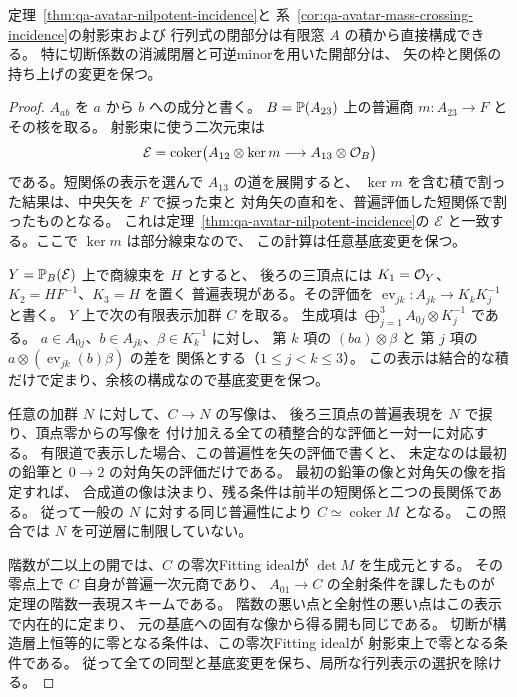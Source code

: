 \begin{proposition}[有限窓の積による行列式構成の内在的表示]
\label{prop:qa-avatar-intrinsic-incidence}
定理~\ref{thm:qa-avatar-nilpotent-incidence}と
系~\ref{cor:qa-avatar-mass-crossing-incidence}の射影束および
行列式の閉部分は有限窓 $A$ の積から直接構成できる。
特に切断係数の消滅閉層と可逆minorを用いた開部分は、
矢の枠と関係の持ち上げの変更を保つ。
\end{proposition}
\begin{proof}
$A_{ab}$ を $a$ から $b$ への成分と書く。
$B=\mathbb P(A_{23})$ 上の普遍商 $m:A_{23}\to F$ とその核を取る。
射影束に使う二次元束は
\[
 \mathcal E=
 \operatorname{coker}\bigl(
 A_{12}\otimes\ker m\longrightarrow A_{13}\otimes\mathcal O_B
 \bigr)
\]
である。短関係の表示を選んで $A_{13}$ の道を展開すると、
$\ker m$ を含む積で割った結果は、中央矢を $F$ で捩った束と
対角矢の直和を、普遍評価した短関係で割ったものとなる。
これは定理~\ref{thm:qa-avatar-nilpotent-incidence}の
$\mathcal E$ と一致する。ここで $\ker m$ は部分線束なので、
この計算は任意基底変更を保つ。

$Y=\mathbb P_B(\mathcal E)$ 上で商線束を $H$ とすると、
後ろの三頂点には
$K_1=\mathcal O_Y$、$K_2=HF^{-1}$、$K_3=H$ を置く
普遍表現がある。その評価を
$\operatorname{ev}_{jk}:A_{jk}\to K_kK_j^{-1}$ と書く。
$Y$ 上で次の有限表示加群 $C$ を取る。
生成項は $\bigoplus_{j=1}^3 A_{0j}\otimes K_j^{-1}$ である。
$a\in A_{0j}$、$b\in A_{jk}$、$\beta\in K_k^{-1}$ に対し、
第 $k$ 項の $(ba)\otimes\beta$ と
第 $j$ 項の $a\otimes(\operatorname{ev}_{jk}(b)\beta)$ の差を
関係とする（$1\leq j<k\leq3$）。
この表示は結合的な積だけで定まり、余核の構成なので基底変更を保つ。

任意の加群 $N$ に対して、$C\to N$ の写像は、
後ろ三頂点の普遍表現を $N$ で捩り、頂点零からの写像を
付け加える全ての積整合的な評価と一対一に対応する。
有限道で表示した場合、この普遍性を矢の評価で書くと、
未定なのは最初の鉛筆と $0\to2$ の対角矢の評価だけである。
最初の鉛筆の像と対角矢の像を指定すれば、
合成道の像は決まり、残る条件は前半の短関係と二つの長関係である。
従って一般の $N$ に対する同じ普遍性により
$C\simeq\operatorname{coker}M$ となる。
この照合では $N$ を可逆層に制限していない。

階数が二以上の開では、$C$ の零次Fitting idealが
$\det M$ を生成元とする。
その零点上で $C$ 自身が普遍一次元商であり、
$A_{01}\to C$ の全射条件を課したものが
定理の階数一表現スキームである。
階数の悪い点と全射性の悪い点はこの表示で内在的に定まり、
元の基底への固有な像から得る開も同じである。
切断が構造層上恒等的に零となる条件は、この零次Fitting idealが
射影束上で零となる条件である。
従って全ての同型と基底変更を保ち、局所な行列表示の選択を除ける。
\end{proof}

